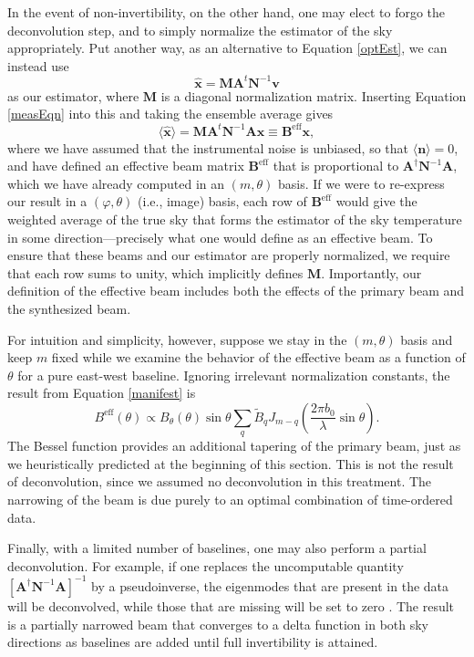 \documentclass[twocolumn,numberedappendix]{emulateapj}
\newcommand{\vis}{\mathbf{v}}
\newcommand{\x}{\mathbf{x}}
\newcommand{\A}{\mathbf{A}}
\newcommand{\N}{\mathbf{N}}
\begin{document}
In the event of non-invertibility, on the other hand, one may elect to forgo
the deconvolution step, and to simply normalize the estimator of the sky
appropriately.  Put another way, as an alternative to Equation \eqref{optEst},
we can instead use
\begin{equation}
\hat{\x} = \mathbf{M} \A^t \N^{-1} \vis
\end{equation}
as our estimator, where $\mathbf{M}$ is a diagonal normalization matrix.
Inserting Equation \eqref{measEqn} into this and taking the ensemble average
gives
\begin{equation}
\langle \hat{\x} \rangle = \mathbf{M} \A^t \N^{-1} \A \x \equiv \mathbf{B}^\textrm{eff} \x,
\end{equation}
where we have assumed that the instrumental noise is unbiased, so that $\langle
\mathbf{n} \rangle = 0$, and have defined an effective beam matrix
$\mathbf{B}^\textrm{eff}$ that is proportional to $\A^\dagger \N^{-1} \A$,
which we have already computed in an $(m, \theta)$ basis.  If we were to
re-express our result in a $(\varphi, \theta)$ (i.e., image) basis, each row of
$\mathbf{B}^\textrm{eff}$ would give the weighted average of the true sky that
forms the estimator of the sky temperature in some direction---precisely what
one would define as an effective beam.  To ensure that these beams and our
estimator are properly normalized, we require that each row sums to unity,
which implicitly defines $\mathbf{M}$.  Importantly, our definition of the
effective beam includes both the effects of the primary beam and the
synthesized beam.

For intuition and simplicity, however, suppose we stay in the $(m, \theta)$
basis and keep $m$ fixed while we examine the behavior of the effective beam as
a function of $\theta$ for a pure east-west baseline.  Ignoring irrelevant
normalization constants, the result from Equation \eqref{manifest} is
\begin{equation}
B^\textrm{eff} (\theta) \propto B_\theta (\theta) \sin \theta \sum_q \widetilde{B}_q  J_{m-q} \left( \frac{2 \pi b_0}{\lambda} \sin \theta \right).
\end{equation}
The Bessel function provides an additional tapering of the primary beam, just
as we heuristically predicted at the beginning of this section.  This is not
the result of deconvolution, since we assumed no deconvolution in this
treatment.  The narrowing of the beam is due purely to an optimal combination
of time-ordered data.

Finally, with a limited number of baselines, one may also perform a partial
deconvolution.  For example, if one replaces the uncomputable quantity $\left[
\A^\dagger \N^{-1} \A \right]^{-1}$ by a pseudoinverse, the eigenmodes that are
present in the data will be deconvolved, while those that are missing will be
set to zero \citep{Shaw2013}.  The result is a partially narrowed beam that
converges to a delta function in both sky directions as baselines are added
until full invertibility is attained.
\end{document}
